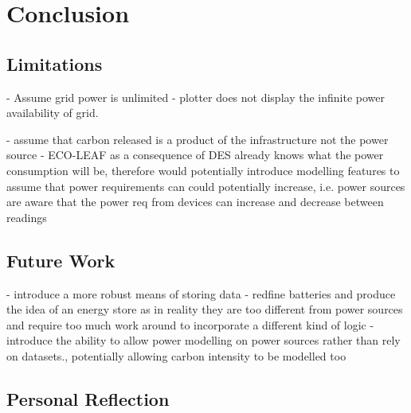 \documentclass{l4proj}
\begin{document}
\chapter{Conclusion}

\section{Limitations}
- Assume grid power is unlimited
- plotter does not display the infinite power availability of grid.

- assume that carbon released is a product of the infrastructure not the power source
- ECO-LEAF as a consequence of DES already knows what the power consumption will be, therefore would potentially introduce modelling features to assume that power requirements can could potentially increase, i.e. power sources are aware that the power req from devices can increase and decrease between readings
\section{Future Work}\label{conc:sec:Future Work}
- introduce a more robust means of storing data
- redfine batteries and produce the idea of an energy store as in reality they are too different from power sources and require too much work around to incorporate a different kind of logic
- introduce the ability to allow power modelling on power sources rather than rely on datasets., potentially allowing carbon intensity to be modelled too
\section{Personal Reflection}\label{conc:sec:Personal Reflection}
\end{document}
